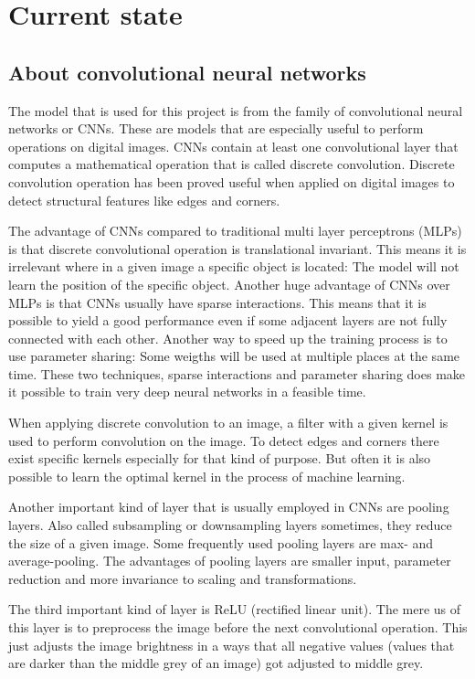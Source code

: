 \chapter{Current state}
\label{ch:currentState}

\section{About convolutional neural networks}

The model that is used for this project is from the family of convolutional neural networks or CNNs. These are models that are especially useful to perform operations on digital images. CNNs contain at least one convolutional layer that computes a mathematical operation that is called discrete convolution. Discrete convolution operation has been proved useful when applied on digital images to detect structural features like edges and corners.

The advantage of CNNs compared to traditional multi layer perceptrons (MLPs) is that discrete convolutional operation is translational invariant. This means it is irrelevant where in a given image a specific object is located: The model will not learn the position of the specific object. Another huge advantage of CNNs over MLPs is that CNNs usually have sparse interactions. This means that it is possible to yield a good performance even if some adjacent layers are not fully connected with each other. Another way to speed up the training process is to use parameter sharing: Some weigths will be used at multiple places at the same time. These two techniques, sparse interactions and parameter sharing does make it possible to train very deep neural networks in a feasible time.

When applying discrete convolution to an image, a filter with a given kernel is used to perform convolution on the image. To detect edges and corners there exist specific kernels especially for that kind of purpose. But often it is also possible to learn the optimal kernel in the process of machine learning.

Another important kind of layer that is usually employed in CNNs are pooling layers. Also called subsampling or downsampling layers sometimes, they reduce the size of a given image. Some frequently used pooling layers are max- and average-pooling. The advantages of pooling layers are smaller input, parameter reduction and more invariance to scaling and transformations.

The third important kind of layer is ReLU (rectified linear unit). The mere us of this layer is to preprocess the image before the next convolutional operation. This just adjusts the image brightness in a ways that all negative values (values that are darker than the middle grey of an image) got adjusted to middle grey.

